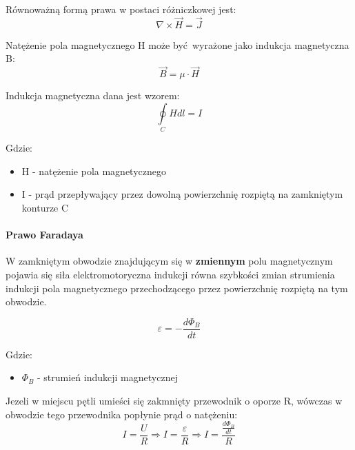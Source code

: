 \documentclass{article}
\begin{document}
            Równoważną formą prawa w postaci różniczkowej jest:
            \begin{equation}
                \nabla \times \vec{H} = \vec{J}
            \end{equation}

            Natężenie pola magnetycznego H może być wyrażone jako indukcja magnetyczna B:
            \begin{equation}
                \vec{B} = \mu \cdotp \vec{H}
            \end{equation}

            Indukcja magnetyczna dana jest wzorem:
            \begin{equation}
                \oint\limits_{C} Hdl = I
            \end{equation}

            Gdzie:
            \begin{itemize}
                \item H - natężenie pola magnetycznego
                \item I - prąd przepływający przez dowolną powierzchnię
                rozpiętą na zamkniętym konturze C
            \end{itemize}

            \paragraph{Prawo Faradaya}
            W zamkniętym obwodzie znajdującym się w \textbf{zmiennym}
            polu magnetycznym pojawia się siła elektromotoryczna
            indukcji równa szybkości zmian strumienia indukcji pola magnetycznego
            przechodzącego przez powierzchnię rozpiętą na tym obwodzie.

            \begin{equation}
                \varepsilon = -\frac{d\Phi_B}{dt}
            \end{equation}

            Gdzie:
            \begin{itemize}
                \item $\Phi_B$ - strumień indukcji magnetycznej
            \end{itemize}

            Jezeli w miejscu pętli umieści się zakmnięty przewodnik o oporze R,
            wówczas w obwodzie tego przewodnika popłynie prąd o natężeniu:
            \begin{equation}
                I = \frac{U}{R} \Longrightarrow I = \frac{\varepsilon}{R} \Longrightarrow
                I = \frac{\frac{d\Phi_B}{dt}}{R}
            \end{equation}
\end{document}
